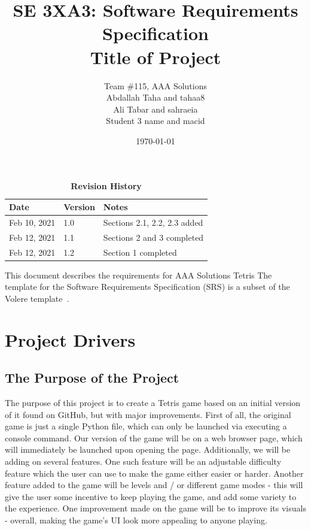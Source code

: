 \documentclass[12pt, titlepage]{article}
\title{SE 3XA3: Software Requirements Specification\\Title of Project}
\author{Team \#115, AAA Solutions
		\\ Abdallah Taha and tahaa8
		\\ Ali Tabar and sahraeia
		\\ Student 3 name and macid
}
\date{\today}
\begin{document}
\maketitle

\tableofcontents
\listoftables
\listoffigures

\begin{table}[bp]
\caption{\bf Revision History}
\begin{tabularx}{\textwidth}{p{3cm}p{2cm}X}
\toprule {\bf Date} & {\bf Version} & {\bf Notes}\\
\midrule
Feb 10, 2021 & 1.0 & Sections 2.1, 2.2, 2.3 added\\
Feb 12, 2021 & 1.1 & Sections 2 and 3 completed\\
Feb 12, 2021 & 1.2 & Section 1 completed\\
\bottomrule
\end{tabularx}
\end{table}

\newpage


This document describes the requirements for AAA Solutions Tetris The template for the Software
Requirements Specification (SRS) is a subset of the Volere
template~\citep{RobertsonAndRobertson2012}.

\section{Project Drivers}

\subsection{The Purpose of the Project}
The purpose of this project is to create a Tetris game based on an initial version of it found on GitHub, but with major improvements. First of all, the original game is just a single Python file, which can only be launched via executing a console command. Our version of the game will be on a web browser page, which will immediately be launched upon opening the page. Additionally, we will be adding on several features. One such feature will be an adjustable difficulty feature which the user can use to make the game either easier or harder. Another feature added to the game will be levels and / or different game modes - this will give the user some incentive to keep playing the game, and add some variety to the experience. 
One improvement made on the game will be to improve its visuals - overall, making the game’s UI look more appealing to anyone playing.
\end{document}
